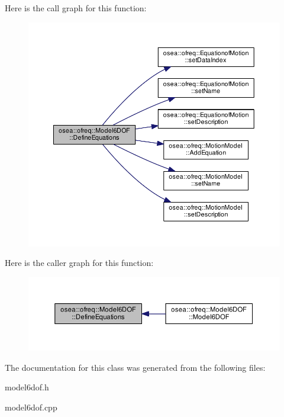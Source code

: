 Here is the call graph for this function\-:
\nopagebreak
\begin{figure}[H]
\begin{center}
\leavevmode
\includegraphics[width=350pt]{classosea_1_1ofreq_1_1_model6_d_o_f_a0048de3d40838c93e2130ebb5130f3a1_cgraph}
\end{center}
\end{figure}




Here is the caller graph for this function\-:
\nopagebreak
\begin{figure}[H]
\begin{center}
\leavevmode
\includegraphics[width=350pt]{classosea_1_1ofreq_1_1_model6_d_o_f_a0048de3d40838c93e2130ebb5130f3a1_icgraph}
\end{center}
\end{figure}




The documentation for this class was generated from the following files\-:\begin{DoxyCompactItemize}
\item 
model6dof.\-h\item 
model6dof.\-cpp\end{DoxyCompactItemize}
